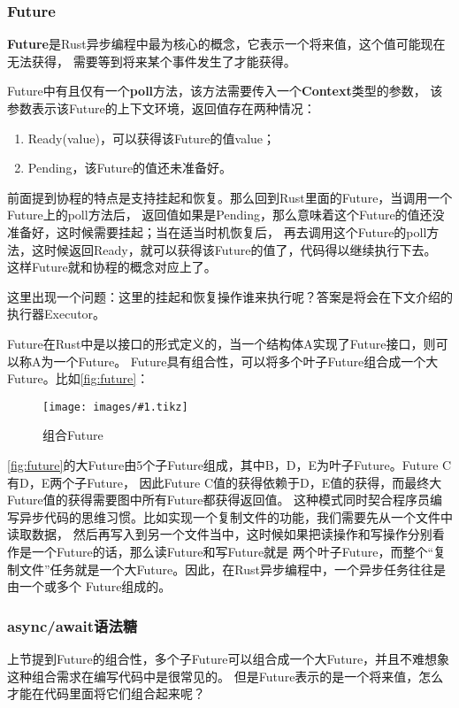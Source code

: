 \documentclass[supercite]{HustGraduPaper}
\newcommand{\cfig}[3]{
  \begin{figure}[htb]
    \centering
    \texttt{[image: images/\#1.tikz]}
    \caption{#3}
    \label{fig:#1}
  \end{figure}
}
\newcommand{\rfig}[1]{\autoref{fig:#1}}
\theoremstyle{definition}
\begin{document}
\subsubsection{Future}
\textbf{Future}是Rust异步编程中最为核心的概念，它表示一个将来值，这个值可能现在无法获得，
需要等到将来某个事件发生了才能获得。\par

Future中有且仅有一个\textbf{poll}方法，该方法需要传入一个\textbf{Context}类型的参数，
该参数表示该Future的上下文环境，返回值存在两种情况：

\begin{enumerate}
  \item Ready(value)，可以获得该Future的值value；
  \item Pending，该Future的值还未准备好。
\end{enumerate}

前面提到协程的特点是支持挂起和恢复。那么回到Rust里面的Future，当调用一个Future上的poll方法后，
返回值如果是Pending，那么意味着这个Future的值还没准备好，这时候需要挂起；当在适当时机恢复后，
再去调用这个Future的poll方法，这时候返回Ready，就可以获得该Future的值了，代码得以继续执行下去。
这样Future就和协程的概念对应上了。\par

这里出现一个问题：这里的挂起和恢复操作谁来执行呢？答案是将会在下文介绍的执行器Executor。\par

Future在Rust中是以接口的形式定义的，当一个结构体A实现了Future接口，则可以称A为一个Future。
Future具有组合性，可以将多个叶子Future组合成一个大Future。比如\rfig{future}：

\cfig{future}{0.4}{组合Future}

\rfig{future}的大Future由5个子Future组成，其中B，D，E为叶子Future。Future C有D，E两个子Future，
因此Future C值的获得依赖于D，E值的获得，而最终大Future值的获得需要图中所有Future都获得返回值。
这种模式同时契合程序员编写异步代码的思维习惯。比如实现一个复制文件的功能，我们需要先从一个文件中读取数据，
然后再写入到另一个文件当中，这时候如果把读操作和写操作分别看作是一个Future的话，那么读Future和写Future就是
两个叶子Future，而整个“复制文件”任务就是一个大Future。因此，在Rust异步编程中，一个异步任务往往是由一个或多个
Future组成的。\par

\subsubsection{async/await语法糖}
上节提到Future的组合性，多个子Future可以组合成一个大Future，并且不难想象这种组合需求在编写代码中是很常见的。
但是Future表示的是一个将来值，怎么才能在代码里面将它们组合起来呢？\par
\end{document}
